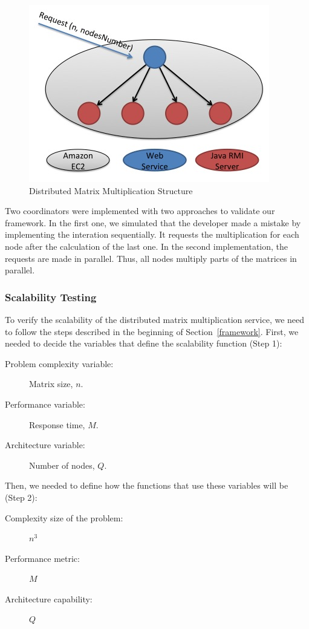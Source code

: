 \begin{figure}[htbp]
\begin{center}
	\includegraphics[scale=0.6]{images/dmm}
\caption{Distributed Matrix Multiplication Structure}
\label{dmm}
\end{center}
\end{figure}

Two coordinators were implemented with two approaches to validate our framework. In the first one, we simulated that the developer made a mistake by implementing the interation sequentially. It requests the multiplication for each node after the calculation of the last one. In the second implementation, the requests are made in parallel. Thus, all nodes multiply parts of the matrices in parallel.

\subsubsection{Scalability Testing}
To verify the scalability of the distributed matrix multiplication service, we need to follow the steps described in the beginning of Section~\ref{framework}. First, we needed to decide the variables that define the scalability function (Step 1):
\begin{description}
\item[Problem complexity variable: ] Matrix size, $n$.
\item[Performance variable: ]  Response time, $M$.
\item[Architecture variable: ] Number of nodes, $Q$.
\end{description}

Then, we needed to define how the functions that use these variables will be (Step 2):
\begin{description}
\item[Complexity size of the problem: ] $n^3$
\item[Performance metric: ]  $M$ 
\item[Architecture capability: ] $Q$
\end{description}

